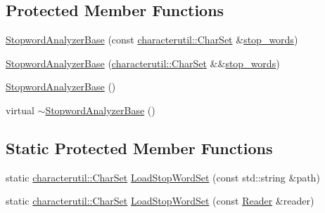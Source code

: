 \subsection*{Protected Member Functions}
\begin{DoxyCompactItemize}
\item 
\mbox{\hyperlink{classlucene_1_1core_1_1analysis_1_1StopwordAnalyzerBase_a07e1b2362b8ac3776cf456250884f898}{Stopword\+Analyzer\+Base}} (const \mbox{\hyperlink{classlucene_1_1core_1_1analysis_1_1characterutil_1_1CharSet}{characterutil\+::\+Char\+Set}} \&\mbox{\hyperlink{classlucene_1_1core_1_1analysis_1_1StopwordAnalyzerBase_a12ceda198e84aabe357ccd7b28e66d07}{stop\+\_\+words}})
\item 
\mbox{\hyperlink{classlucene_1_1core_1_1analysis_1_1StopwordAnalyzerBase_ab15b0a23b58e1d09b2d65338349f0260}{Stopword\+Analyzer\+Base}} (\mbox{\hyperlink{classlucene_1_1core_1_1analysis_1_1characterutil_1_1CharSet}{characterutil\+::\+Char\+Set}} \&\&\mbox{\hyperlink{classlucene_1_1core_1_1analysis_1_1StopwordAnalyzerBase_a12ceda198e84aabe357ccd7b28e66d07}{stop\+\_\+words}})
\item 
\mbox{\hyperlink{classlucene_1_1core_1_1analysis_1_1StopwordAnalyzerBase_a94f2df7bf83363d5690e925c3140157d}{Stopword\+Analyzer\+Base}} ()
\item 
virtual \mbox{\hyperlink{classlucene_1_1core_1_1analysis_1_1StopwordAnalyzerBase_a464b01561952e4244b31df0a61045d63}{$\sim$\+Stopword\+Analyzer\+Base}} ()
\end{DoxyCompactItemize}
\subsection*{Static Protected Member Functions}
\begin{DoxyCompactItemize}
\item 
static \mbox{\hyperlink{classlucene_1_1core_1_1analysis_1_1characterutil_1_1CharSet}{characterutil\+::\+Char\+Set}} \mbox{\hyperlink{classlucene_1_1core_1_1analysis_1_1StopwordAnalyzerBase_a72330e7251da134ad13afdf181c1f04a}{Load\+Stop\+Word\+Set}} (const std\+::string \&path)
\item 
static \mbox{\hyperlink{classlucene_1_1core_1_1analysis_1_1characterutil_1_1CharSet}{characterutil\+::\+Char\+Set}} \mbox{\hyperlink{classlucene_1_1core_1_1analysis_1_1StopwordAnalyzerBase_ab768bf79e306a74d72ecfea48080018f}{Load\+Stop\+Word\+Set}} (const \mbox{\hyperlink{classlucene_1_1core_1_1analysis_1_1Reader}{Reader}} \&reader)
\end{DoxyCompactItemize}
